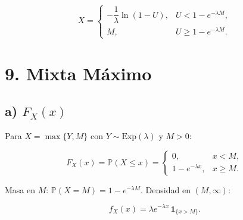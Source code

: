 \documentclass[10pt,a4paper]{article}
\begin{document}
\[
X=\begin{cases}
-\dfrac{1}{\lambda}\ln(1-U),&U<1-e^{-\lambda M},\\[6pt]
M,&U\geq 1-e^{-\lambda M}.
\end{cases}
\]

    \hypertarget{mixta-xmaxym-con-ysimmathrmexplambda}{%
\section{9. Mixta Máximo}\label{mixta-xmaxym-con-ysimmathrmexplambda}}

    \hypertarget{a-grafica-de-f_xx}{%
\subsection{\texorpdfstring{a) 
\(F_X(x)\)}{a) F\_X(x)}}\label{a-grafica-de-f_xx}}

    Para \(X=\max\{Y,M\}\) con \(Y\sim\mathrm{Exp}(\lambda)\) y \(M>0\):

\[
F_X(x)=\mathbb P(X\leq x)=
\begin{cases}
0,& x<M,\\[4pt]
1-e^{-\lambda x},& x\geq M.
\end{cases}
\]

Masa en \(M\): \(\mathbb P(X=M)=1-e^{-\lambda M}\). Densidad en
\((M,\infty)\):

\[
f_X(x)=\lambda e^{-\lambda x}\,\mathbf 1_{\{x>M\}}.
\]
\end{document}
